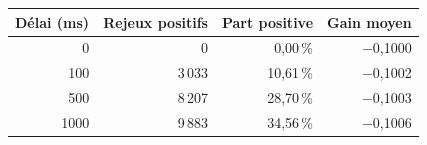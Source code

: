 \begin{tabular}{@{}rrrr@{}}
\toprule
Délai (ms) & Rejeux positifs & Part positive & Gain moyen\\
\midrule
0 & 0 & 0,00\,\% & \ensuremath{-}0,1000\\
100 & 3\,033 & 10,61\,\% & \ensuremath{-}0,1002\\
500 & 8\,207 & 28,70\,\% & \ensuremath{-}0,1003\\
1000 & 9\,883 & 34,56\,\% & \ensuremath{-}0,1006\\
\bottomrule
\end{tabular}
